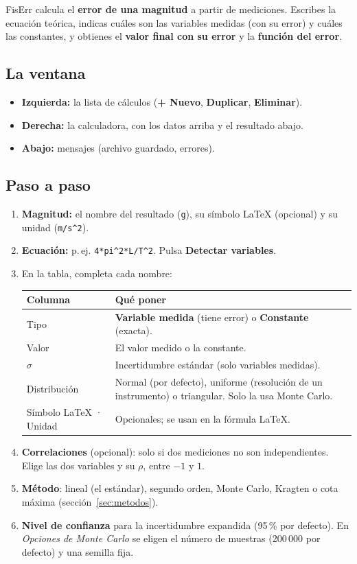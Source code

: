 \documentclass[11pt,a4paper]{article}
\newcommand{\code}[1]{\texttt{#1}}
\newcommand{\boton}[1]{\textsf{\bfseries #1}}
\begin{document}
FisErr calcula el \textbf{error de una magnitud} a partir de mediciones. Escribes la ecuación teórica, indicas cuáles son las variables medidas (con su error) y cuáles las constantes, y obtienes el \textbf{valor final con su error} y la \textbf{función del error}.

\subsection{La ventana}

\begin{itemize}
  \item \textbf{Izquierda:} la lista de cálculos (\boton{+ Nuevo}, \boton{Duplicar}, \boton{Eliminar}).
  \item \textbf{Derecha:} la calculadora, con los datos arriba y el resultado abajo.
  \item \textbf{Abajo:} mensajes (archivo guardado, errores).
\end{itemize}

\subsection{Paso a paso}

\begin{enumerate}
  \item \textbf{Magnitud:} el nombre del resultado (\code{g}), su símbolo LaTeX (opcional) y su unidad (\code{m/s\^{}2}).
  \item \textbf{Ecuación:} p.\,ej. \code{4*pi\^{}2*L/T\^{}2}. Pulsa \boton{Detectar variables}.
  \item En la tabla, completa cada nombre:

  \begin{tabularx}{\linewidth}{@{}lX@{}}\toprule
  \textbf{Columna} & \textbf{Qué poner}\\\midrule
  Tipo & \textbf{Variable medida} (tiene error) o \textbf{Constante} (exacta).\\
  Valor & El valor medido o la constante.\\
  $\sigma$ & Incertidumbre estándar (solo variables medidas).\\
  Distribución & Normal (por defecto), uniforme (resolución de un instrumento) o triangular. Solo la usa Monte Carlo.\\
  Símbolo LaTeX · Unidad & Opcionales; se usan en la fórmula LaTeX.\\\bottomrule
  \end{tabularx}

  \item \textbf{Correlaciones} (opcional): solo si dos mediciones no son independientes. Elige las dos variables y su $\rho$, entre $-1$ y $1$.
  \item \textbf{Método}: lineal (el estándar), segundo orden, Monte Carlo, Kragten o cota máxima (sección~\ref{sec:metodos}).
  \item \textbf{Nivel de confianza} para la incertidumbre expandida (95\,\% por defecto). En \emph{Opciones de Monte Carlo} se eligen el número de muestras (200\,000 por defecto) y una semilla fija.
\end{enumerate}
\end{document}
